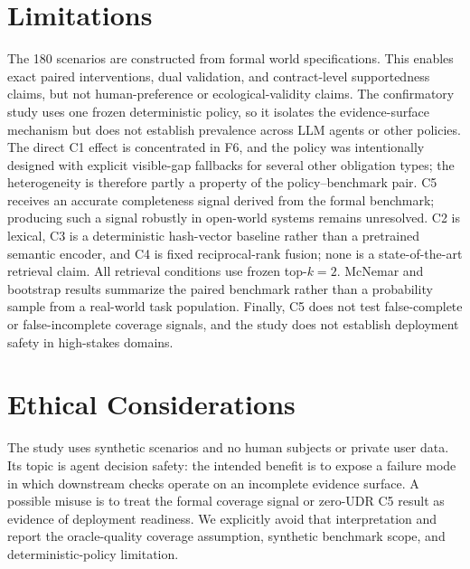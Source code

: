 \documentclass[11pt]{article}
\begin{document}
\section*{Limitations}
The 180 scenarios are constructed from formal world specifications. This enables exact
paired interventions, dual validation, and contract-level supportedness claims, but not
human-preference or ecological-validity claims. The confirmatory study uses one frozen
deterministic policy, so it isolates the evidence-surface mechanism but does not establish
prevalence across LLM agents or other policies. The direct C1 effect is concentrated in F6,
and the policy was intentionally designed with explicit visible-gap fallbacks for several
other obligation types; the heterogeneity is therefore partly a property of the
policy--benchmark pair. C5 receives an accurate completeness signal derived from the formal
benchmark; producing such a signal robustly in open-world systems remains unresolved. C2 is
lexical, C3 is a deterministic hash-vector baseline rather than a pretrained semantic
encoder, and C4 is fixed reciprocal-rank fusion; none is a state-of-the-art retrieval claim.
All retrieval conditions use frozen top-$k=2$. McNemar and bootstrap results summarize the
paired benchmark rather than a probability sample from a real-world task population.
Finally, C5 does not test false-complete or false-incomplete coverage signals, and the study
does not establish deployment safety in high-stakes domains.

\section*{Ethical Considerations}
The study uses synthetic scenarios and no human subjects or private user data. Its topic is
agent decision safety: the intended benefit is to expose a failure mode in which downstream
checks operate on an incomplete evidence surface. A possible misuse is to treat the formal
coverage signal or zero-UDR C5 result as evidence of deployment readiness. We explicitly
avoid that interpretation and report the oracle-quality coverage assumption, synthetic
benchmark scope, and deterministic-policy limitation.


\end{document}
